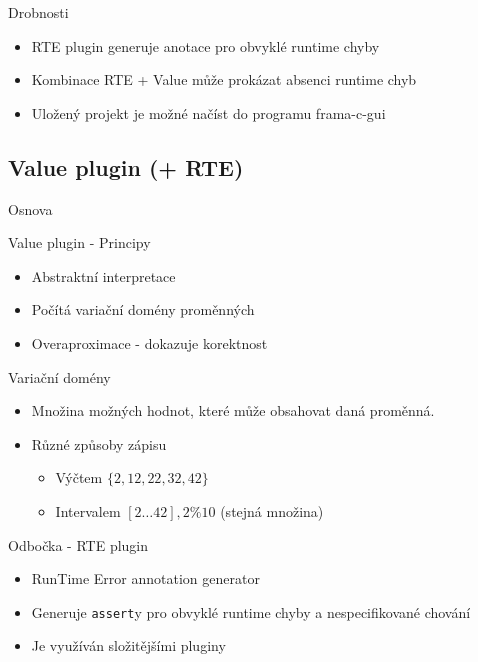 \documentclass[11pt]{beamer}
\begin{document}
\begin{frame}{Drobnosti}
	\begin{itemize}
		\item RTE plugin generuje anotace pro obvyklé runtime chyby
		\item Kombinace RTE + Value může prokázat absenci runtime chyb
		\item Uložený projekt je možné načíst do programu frama-c-gui
	\end{itemize}
\end{frame}

\subsection{Value plugin (+ RTE)}

\begin{frame}{Osnova}
\end{frame}

\begin{frame}{Value plugin - Principy}
	\begin{itemize}
			\item Abstraktní interpretace
			\item Počítá variační domény proměnných
			\item Overaproximace - dokazuje korektnost
	\end{itemize}
\end{frame}

\begin{frame}{Variační domény}
	\begin{itemize}
			\item Množina možných hodnot, které může obsahovat daná proměnná.
			\item Různé způsoby zápisu
			\begin{itemize}
				\item Výčtem \( \{ 2, 12, 22, 32, 42 \} \)
				\item Intervalem \( [2 \ldots 42], 2 \% 10 \) \pause (stejná množina)
			\end{itemize}
	\end{itemize}
\end{frame}

\begin{frame}{Odbočka - RTE plugin}
	\begin{itemize}
			\item RunTime Error annotation generator
			\pause \item Generuje \texttt{assert}y pro obvyklé runtime chyby a nespecifikované chování
			\pause \item Je využíván složitějšími pluginy
	\end{itemize}
\end{frame}
\end{document}
